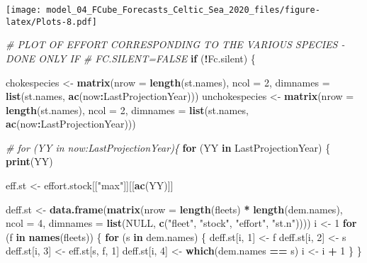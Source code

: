 \documentclass[
]{article}
\newenvironment{Shaded}{\begin{snugshade}}{\end{snugshade}}
\newcommand{\CommentTok}[1]{\textcolor[rgb]{0.56,0.35,0.01}{\textit{#1}}}
\newcommand{\ControlFlowTok}[1]{\textcolor[rgb]{0.13,0.29,0.53}{\textbf{#1}}}
\newcommand{\DataTypeTok}[1]{\textcolor[rgb]{0.13,0.29,0.53}{#1}}
\newcommand{\DecValTok}[1]{\textcolor[rgb]{0.00,0.00,0.81}{#1}}
\newcommand{\KeywordTok}[1]{\textcolor[rgb]{0.13,0.29,0.53}{\textbf{#1}}}
\newcommand{\NormalTok}[1]{#1}
\newcommand{\OperatorTok}[1]{\textcolor[rgb]{0.81,0.36,0.00}{\textbf{#1}}}
\newcommand{\OtherTok}[1]{\textcolor[rgb]{0.56,0.35,0.01}{#1}}
\newcommand{\StringTok}[1]{\textcolor[rgb]{0.31,0.60,0.02}{#1}}
\begin{document}
\texttt{[image: model\_04\_FCube\_Forecasts\_Celtic\_Sea\_2020\_files/figure-latex/Plots-8.pdf]}

\begin{Shaded}
\begin{Highlighting}[]
\CommentTok{# PLOT OF EFFORT CORRESPONDING TO THE VARIOUS SPECIES - DONE ONLY IF}
\CommentTok{# FC.SILENT=FALSE}
\ControlFlowTok{if}\NormalTok{ (}\OperatorTok{!}\NormalTok{Fc.silent) \{}
    
\NormalTok{    chokespecies <-}\StringTok{ }\KeywordTok{matrix}\NormalTok{(}\DataTypeTok{nrow =} \KeywordTok{length}\NormalTok{(st.names), }\DataTypeTok{ncol =} \DecValTok{2}\NormalTok{, }\DataTypeTok{dimnames =} \KeywordTok{list}\NormalTok{(st.names, }
        \KeywordTok{ac}\NormalTok{(now}\OperatorTok{:}\NormalTok{LastProjectionYear)))}
\NormalTok{    unchokespecies <-}\StringTok{ }\KeywordTok{matrix}\NormalTok{(}\DataTypeTok{nrow =} \KeywordTok{length}\NormalTok{(st.names), }\DataTypeTok{ncol =} \DecValTok{2}\NormalTok{, }\DataTypeTok{dimnames =} \KeywordTok{list}\NormalTok{(st.names, }
        \KeywordTok{ac}\NormalTok{(now}\OperatorTok{:}\NormalTok{LastProjectionYear)))}
    
    \CommentTok{# for (YY in now:LastProjectionYear)\{}
    \ControlFlowTok{for}\NormalTok{ (YY }\ControlFlowTok{in}\NormalTok{ LastProjectionYear) \{}
        \KeywordTok{print}\NormalTok{(YY)}
        
\NormalTok{        eff.st <-}\StringTok{ }\NormalTok{effort.stock[[}\StringTok{"max"}\NormalTok{]][[}\KeywordTok{ac}\NormalTok{(YY)]]}
        
\NormalTok{        deff.st <-}\StringTok{ }\KeywordTok{data.frame}\NormalTok{(}\KeywordTok{matrix}\NormalTok{(}\DataTypeTok{nrow =} \KeywordTok{length}\NormalTok{(fleets) }\OperatorTok{*}\StringTok{ }\KeywordTok{length}\NormalTok{(dem.names), }\DataTypeTok{ncol =} \DecValTok{4}\NormalTok{, }
            \DataTypeTok{dimnames =} \KeywordTok{list}\NormalTok{(}\OtherTok{NULL}\NormalTok{, }\KeywordTok{c}\NormalTok{(}\StringTok{"fleet"}\NormalTok{, }\StringTok{"stock"}\NormalTok{, }\StringTok{"effort"}\NormalTok{, }\StringTok{"st.n"}\NormalTok{))))}
\NormalTok{        i <-}\StringTok{ }\DecValTok{1}
        \ControlFlowTok{for}\NormalTok{ (f }\ControlFlowTok{in} \KeywordTok{names}\NormalTok{(fleets)) \{}
            \ControlFlowTok{for}\NormalTok{ (s }\ControlFlowTok{in}\NormalTok{ dem.names) \{}
\NormalTok{                deff.st[i, }\DecValTok{1}\NormalTok{] <-}\StringTok{ }\NormalTok{f}
\NormalTok{                deff.st[i, }\DecValTok{2}\NormalTok{] <-}\StringTok{ }\NormalTok{s}
\NormalTok{                deff.st[i, }\DecValTok{3}\NormalTok{] <-}\StringTok{ }\NormalTok{eff.st[s, f, }\DecValTok{1}\NormalTok{]}
\NormalTok{                deff.st[i, }\DecValTok{4}\NormalTok{] <-}\StringTok{ }\KeywordTok{which}\NormalTok{(dem.names }\OperatorTok{==}\StringTok{ }\NormalTok{s)}
\NormalTok{                i <-}\StringTok{ }\NormalTok{i }\OperatorTok{+}\StringTok{ }\DecValTok{1}
\NormalTok{            \}}
\NormalTok{        \}}
        

\end{Highlighting}
\end{Shaded}
\end{document}
